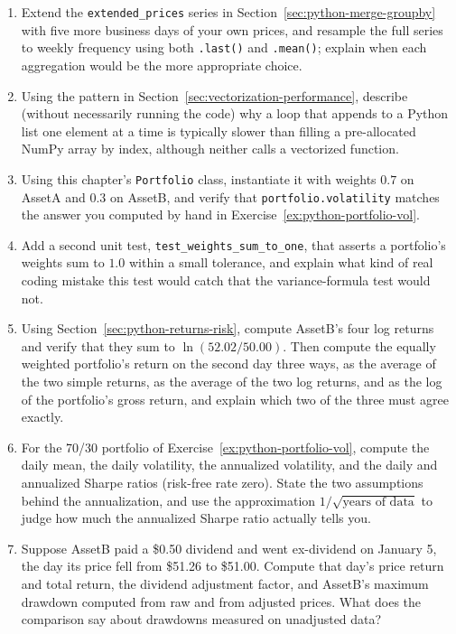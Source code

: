 \documentclass[../ai_in_finance]{subfiles}
\begin{document}
\begin{enumerate}[exercises]
    \item Extend the \texttt{extended\_prices} series in Section~\ref{sec:python-merge-groupby} with five more business days of your own prices, and resample the full series to weekly frequency using both \texttt{.last()} and \texttt{.mean()}; explain when each aggregation would be the more appropriate choice.
    \item Using the pattern in Section~\ref{sec:vectorization-performance}, describe (without necessarily running the code) why a loop that appends to a Python list one element at a time is typically slower than filling a pre-allocated NumPy array by index, although neither calls a vectorized function.
    \item Using this chapter's \texttt{Portfolio} class, instantiate it with weights $0.7$ on AssetA and $0.3$ on AssetB, and verify that \texttt{portfolio.volatility} matches the answer you computed by hand in Exercise~\ref{ex:python-portfolio-vol}.
    \item Add a second unit test, \texttt{test\_weights\_sum\_to\_one}, that asserts a portfolio's weights sum to $1.0$ within a small tolerance, and explain what kind of real coding mistake this test would catch that the variance-formula test would not.
    \item Using Section~\ref{sec:python-returns-risk}, compute AssetB's four log returns and verify that they sum to $\ln(52.02/50.00)$. Then compute the equally weighted portfolio's return on the second day three ways, as the average of the two simple returns, as the average of the two log returns, and as the log of the portfolio's gross return, and explain which two of the three must agree exactly.
    \item For the 70/30 portfolio of Exercise~\ref{ex:python-portfolio-vol}, compute the daily mean, the daily volatility, the annualized volatility, and the daily and annualized Sharpe ratios (risk-free rate zero). State the two assumptions behind the annualization, and use the approximation $1/\sqrt{\text{years of data}}$ to judge how much the annualized Sharpe ratio actually tells you.
    \item Suppose AssetB paid a \$0.50 dividend and went ex-dividend on January 5, the day its price fell from \$51.26 to \$51.00. Compute that day's price return and total return, the dividend adjustment factor, and AssetB's maximum drawdown computed from raw and from adjusted prices. What does the comparison say about drawdowns measured on unadjusted data?

\end{enumerate}
\end{document}
